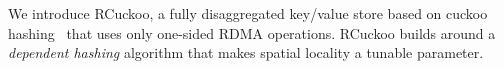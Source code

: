 
We introduce RCuckoo, a fully disaggregated key/value store based on
cuckoo hashing~\cite{cuckoo} that
uses only one-sided RDMA operations.
RCuckoo builds
around a \emph{dependent hashing} algorithm that makes spatial
locality a tunable parameter.
%
%
%
%
%

